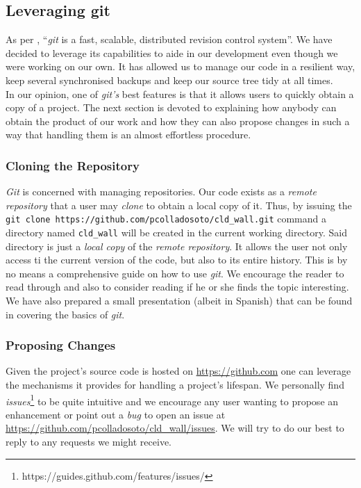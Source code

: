         \subsection{Leveraging git}
            As per \cite{bib:man-git}, ``\textit{git} is a fast, scalable, distributed revision control system''. We have decided to leverage its capabilities to aide in our development even though we were working on our own. It has allowed us to manage our code in a resilient way, keep several synchronised backups and keep our source tree tidy at all times.\\

            In our opinion, one of \textit{git's} best features is that it allows users to quickly obtain a copy of a project. The next section is devoted to explaining how anybody can obtain the product of our work and how they can also propose changes in such a way that handling them is an almost effortless procedure.\\

            \subsubsection{Cloning the Repository}
                \textit{Git} is concerned with managing repositories. Our code exists as a \textit{remote repository} that a user may \textit{clone} to obtain a local copy of it. Thus, by issuing the \texttt{git clone https://github.com/pcolladosoto/cld\_wall.git} command a directory named \texttt{cld\_wall} will be created in the current working directory. Said directory is just a \textit{local copy} of the \textit{remote repository}. It allows the user not only access ti the current version of the code, but also to its entire history. This is by no means a comprehensive guide on how to use \textit{git}. We encourage the reader to read through \cite{bib:man-git} and also to consider reading \cite{bib:pro-git} if he or she finds the topic interesting. We have also prepared a small presentation (albeit in Spanish) that can be found in \cite{bib:git-talk} covering the basics of \textit{git}.\\

            \subsubsection{Proposing Changes}
                Given the project's source code is hosted on \url{https://github.com} one can leverage the mechanisms it provides for handling a project's lifespan. We personally find \textit{issues}\footnote{https://guides.github.com/features/issues/} to be quite intuitive and we encourage any user wanting to propose an enhancement or point out a \textit{bug} to open an issue at \url{https://github.com/pcolladosoto/cld\_wall/issues}. We will try to do our best to reply to any requests we might receive.\\

